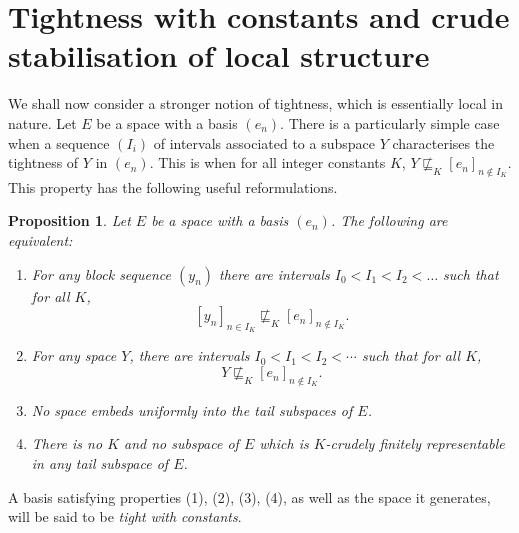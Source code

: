 \documentclass[10pt]{amsart}
\numberwithin{equation}{section}
\newtheorem{prop} [thm] {Proposition}
\begin{document}
\section{Tightness with constants and crude stabilisation of local structure}
We shall now consider a stronger notion of tightness, which is essentially
local in nature. Let $E$ be a space with a basis $(e_n)$. There is a
particularly simple case when a sequence $(I_i)$ of intervals associated to a
subspace $Y$ characterises the tightness of $Y$ in $(e_n)$. This is when for
all integer constants $K$, $Y \not\sqsubseteq_K [e_n]_{ n \notin I_K}$. This
property has the following useful reformulations.
\begin{prop}\label{tightnesswithconstants} Let $E$ be a space with a basis $(e_n)$. The following are equivalent:
 \begin{enumerate}
\item For any block sequence $(y_n)$  there are intervals $I_0<I_1<I_2<\ldots$ such that for all $K$,
$$
[y_n]_{n\in I_K}\not\sqsubseteq_K[e_n]_{n\notin I_K}.
$$
\item  For any space $Y$, there are intervals $I_0<I_1<I_2<\cdots$ such that for all $K$,
$$
Y \not\sqsubseteq_K[e_n]_{ n \notin I_K}.
$$
\item  No space embeds uniformly into the tail subspaces of $E$.
\item  There is no $K$ and no subspace of $E$ which is $K$-crudely finitely representable in any tail subspace of $E$.
\end{enumerate}
\end{prop}

A basis satisfying properties (1), (2), (3), (4), as well as the space it
generates, will be said to be {\em tight with constants}.
\end{document}
